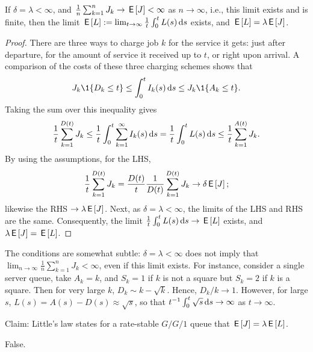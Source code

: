 \documentclass[stochastic-or.tex]{subfiles}
\begin{document}
\begin{theorem}[Little's Law, $\E L = \lambda \E J$]
If $\delta = \lambda < \infty$, and $\frac{1}{n}\sum_{k=1}^{n} J_{k} \to \,\mathsf{E}\left[J\right] < \infty$  as $n\to \infty$, i.e., this limit exists and is finite, then the limit $\,\mathsf{E}\left[L\right] := \lim_{t\to\infty} \frac{1}{t}\int_{0}^{t}L(s)\,\textrm{d}s$ exists, and $\E L = \lambda \E J$.
\end{theorem}
\begin{proof}
There are three ways to  charge job $k$ for the service it gets:  just after departure, for the amount of service it received up to $t$, or right upon arrival.
A comparison of the costs of these three charging schemes shows that
\begin{equation*}
J_{k} \1{D_k\leq t} \leq \int_0^t I_k(s) \d s \leq J_k \1{A_k \leq t}.
\end{equation*}
Taking the sum over this inequality gives
\begin{equation*}
\frac{1}{t} \sum_{k=1}^{D(t)} J_k \leq \frac{1}{t}\int_0^t \sum_{k=1}^{\infty} I_k(s) \,\textrm{d}s = \frac{1}{t} \int_{0}^{t}L(s) \,\textrm{d}s \leq \frac{1}{t}\sum_{k=1}^{A(t)} J_{k}.
\end{equation*}
By using the assumptions, for the LHS,
\begin{equation*}
\frac{1}{t} \sum_{k=1}^{D(t)} J_k = \frac{D(t)}{t}\frac{1}{D(t)} \sum_{k=1}^{D(t)}J_k \to \delta \,\mathsf{E}\left[J\right];
\end{equation*}
likewise  the RHS $\to \lambda \,\mathsf{E}\left[J\right]$.
Next, as $\delta = \lambda< \infty$, the limits of the LHS and RHS are the same.
Consequently, the limit $\frac{1}{t}\int_{0}^t L(s) \,\textrm{d}s \to \,\mathsf{E}\left[L\right]$ exists, and $\lambda \,\mathsf{E}\left[J\right] = \,\mathsf{E}\left[L\right]$.
\end{proof}

The conditions are somewhat subtle: $\delta = \lambda < \infty$ does not imply that $\lim_{n\to\infty} \frac{1}{n}\sum_{k=1}^{n} J_{k} < \infty$, even if this limit exists.
For instance, consider a single server queue, take $A_k = k$, and $S_k = 1$ if $k$ is not a square but $S_k = 2$ if $k$ is a square.
Then for very large $k$, $D_k \sim k - \sqrt k$.
Hence, $D_k/k\to1$.
However, for large $s$, $L(s) = A(s) - D(s) \approx \sqrt s$, so that $t^{-1}\int_0^t\sqrt s \,\textrm{d}s \to \infty$ as $t\to \infty$.

\begin{truefalse}
Claim: Little's law states  for a rate-stable $G/G/1$ queue that $\,\mathsf{E}\left[J\right]=\lambda\,\mathsf{E}\left[L\right]$.
\begin{solution}
False.
\end{solution}
\end{truefalse}
\end{document}
